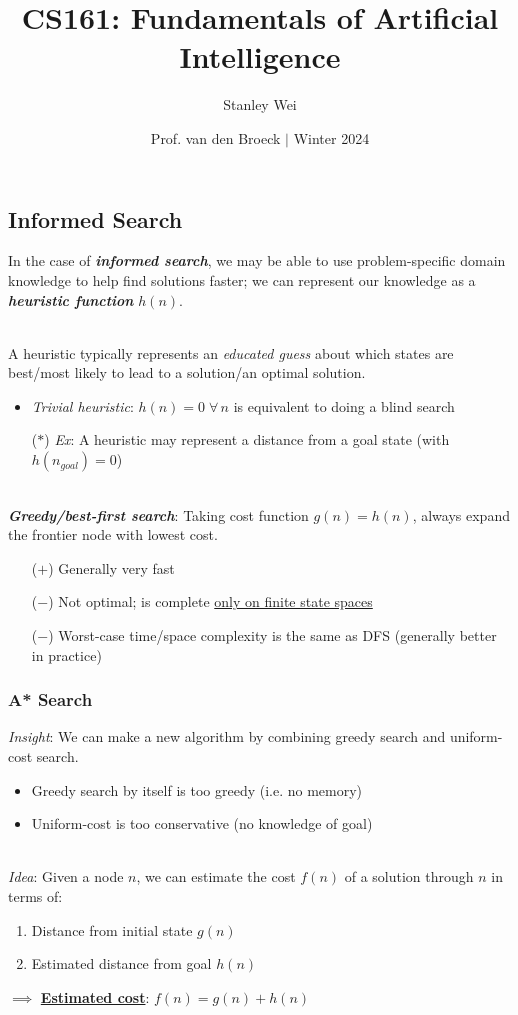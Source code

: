 \documentclass[12pt]{extarticle}
\title{CS161: Fundamentals of Artificial Intelligence}
\author{Stanley Wei}
\date{Prof. van den Broeck $\vert$ Winter 2024}
\theoremstyle{definition}
\theoremstyle{remark}
\newcommand{\pstart}[0]{\noindent}
\newcommand{\newp}[0]{~\\ \pstart}
\newcommand{\term}[1]{\noindent\textbf{\textit{#1}}}
\newcommand{\titleul}[1]{\noindent \textbf{\ul{#1}}}
\begin{document}
\subsection{Informed Search}
In the case of \term{informed search}, we may be able to use problem-specific domain knowledge to help find solutions faster; we can represent our knowledge as a \term{heuristic function} $h(n)$. 

\newp
A heuristic typically represents an \textit{educated guess} about which states are best/most likely to lead to a solution/an optimal solution.
\begin{itemize}
    \item \textit{Trivial heuristic}: $h(n)=0\;\forall\,n$ is equivalent to doing a blind search
    \item[($\ast$)] \textit{Ex}: A heuristic may represent a distance from a goal state (with $h(n_{goal})=0$)
\end{itemize}

~\\
\term{Greedy/best-first search}: Taking cost function $g(n)=h(n)$, always expand the frontier node with lowest cost. \begin{itemize}
    \item[($+$)] Generally very fast
    \item[($-$)] Not optimal; is complete \ul{only on finite state spaces}
    \item[($-$)] Worst-case time/space complexity is the same as DFS (generally better in practice)
\end{itemize}


\subsubsection{A* Search}
\textit{Insight}: We can make a new algorithm by combining greedy search and uniform-cost search. \begin{itemize}
    \item Greedy search by itself is too greedy (i.e. no memory)
    \item Uniform-cost is too conservative (no knowledge of goal)
\end{itemize}

~\\ \pstart
\textit{Idea}: Given a node $n$, we can estimate the cost $f(n)$ of a solution through $n$ in terms of: \begin{enumerate}
    \item Distance from initial state $g(n)$
    \item Estimated distance from goal $h(n)$
\end{enumerate}
\begin{center}
    \noindent $\implies$ \titleul{Estimated cost}: $f(n)=g(n)+h(n)$
\end{center}
\end{document}
